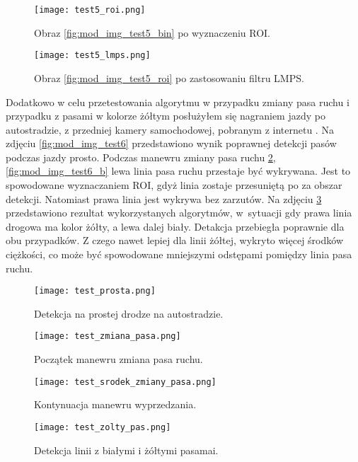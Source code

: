 \begin{figure}
	\begin{minipage}{0.48\textwidth}
		\centering
		\texttt{[image: test5\_roi.png]}
		\caption{Obraz \ref{fig:mod_img_test5_bin} po wyznaczeniu ROI.}
		\label{fig:mod_img_test5_roi}
	\end{minipage}
	\begin{minipage}{0.48\textwidth}
		\centering
		\texttt{[image: test5\_lmps.png]}
		\caption{Obraz \ref{fig:mod_img_test5_roi} po zastosowaniu filtru LMPS.}
		\label{fig:mod_img_test5_lmps}
	\end{minipage}
\end{figure}

Dodatkowo w celu przetestowania algorytmu w przypadku zmiany pasa ruchu i przypadku z pasami w kolorze żółtym posłużyłem się nagraniem jazdy po autostradzie, z przedniej kamery samochodowej, pobranym z internetu \cite{youtube_mat}.
Na zdjęciu \ref{fig:mod_img_test6} przedstawiono wynik poprawnej detekcji pasów podczas jazdy prosto.
Podczas manewru zmiany pasa ruchu \ref{fig:mod_img_test6_a}, \ref{fig:mod_img_test6_b} lewa linia pasa ruchu przestaje być wykrywana. Jest to spowodowane wyznaczaniem ROI, gdyż linia zostaje przesuniętą po za obszar detekcji. Natomiast prawa linia jest wykrywa bez zarzutów.
Na zdjęciu \ref{fig:mod_img_test6_c} przedstawiono rezultat wykorzystanych algorytmów, w~sytuacji gdy prawa linia  drogowa ma kolor żółty, a lewa dalej biały.
Detakcja przebiegła poprawnie dla obu przypadków. Z czego nawet lepiej dla linii żółtej, wykryto więcej środków ciężkości, co może być spowodowane mniejszymi odstępami pomiędzy linia pasa ruchu.

\begin{figure}
	\begin{minipage}{0.48\textwidth}
		\centering
		\texttt{[image: test\_prosta.png]}
		\caption{Detekcja na prostej drodze na autostradzie.}
		\label{fig:mod_img_test6}
	\end{minipage}
	\begin{minipage}{0.48\textwidth}
		\centering
		\texttt{[image: test\_zmiana\_pasa.png]}
		\caption{Początek manewru zmiana pasa ruchu.}
		\label{fig:mod_img_test6_a}
	\end{minipage}
\end{figure}
\begin{figure}
	\begin{minipage}{0.48\textwidth}
		\centering
		\texttt{[image: test\_srodek\_zmiany\_pasa.png]}
		\caption{Kontynuacja manewru wyprzedzania.}
		\label{fig:mod_img_test6_b}
	\end{minipage}
	\begin{minipage}{0.48\textwidth}
		\centering
		\texttt{[image: test\_zolty\_pas.png]}
		\caption{Detekcja linii z białymi i żółtymi pasamai.}
		\label{fig:mod_img_test6_c}
	\end{minipage}
\end{figure}
